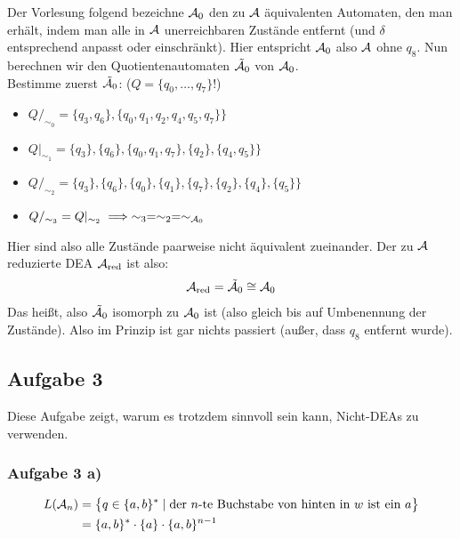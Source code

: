 Der Vorlesung folgend bezeichne $\mathcal{A}_0$ den zu $\mathcal{A}$ äquivalenten Automaten, den man erhält, indem man alle in $\mathcal{A}$ unerreichbaren Zustände entfernt (und $\delta$ entsprechend anpasst oder einschränkt). 
Hier entspricht $\mathcal{A}_0$ also $\mathcal{A}$ ohne $q_8$.\nl
Nun berechnen wir den Quotientenautomaten $\tilde{\mathcal{A}}_0$ von $\mathcal{A}_0$.\\
Bestimme zuerst $\tilde{\mathcal{A}}_0$: ($Q=\lbrace q_0,\ldots,q_7\rbrace$!)
\begin{itemize}
	\item $Q/_{\sim_0}=\big\lbrace q_3,q_6\rbrace,\lbrace q_0,q_1,q_2,q_4,q_5,q_7\rbrace\big\rbrace$
	\item $Q|_{\sim_1}=\big\lbrace q_3\rbrace,\lbrace q_6\rbrace,\lbrace q_0,q_1,q_7\rbrace,\lbrace q_2\rbrace,\lbrace q_4,q_5\rbrace\big\rbrace$
	\item $Q/_{\sim_2}=\big\lbrace q_3\rbrace,\lbrace q_6\rbrace,\lbrace q_0\rbrace,\lbrace q_1\rbrace,\lbrace q_7\rbrace,\lbrace q_2\rbrace,\lbrace q_4\rbrace,\lbrace q_5\rbrace\big\rbrace$
	\item $Q/_{\sim_3}=Q|_{\sim_2}\implies\sim_3=\sim_2=\sim_{\mathcal{A}_0}$
\end{itemize}
Hier sind also alle Zustände paarweise nicht äquivalent zueinander. 
Der zu $\mathcal{A}$ reduzierte DEA $\mathcal{A}_{\text{red}}$ ist also:
\begin{align*}
	\mathcal{A}_{\text{red}}=\tilde{\mathcal{A}}_0\cong\mathcal{A}_0
\end{align*}
Das heißt, also $\tilde{\mathcal{A}}_0$ isomorph zu $\mathcal{A}_0$ ist (also gleich bis auf Umbenennung der Zustände). Also im Prinzip ist gar nichts passiert (außer, dass $q_8$ entfernt wurde).

\subsection{Aufgabe 3}
Diese Aufgabe zeigt, warum es trotzdem sinnvoll sein kann, Nicht-DEAs zu verwenden.

\subsubsection{Aufgabe 3 a)}
\begin{align*}
	L(\mathcal{A}_n)
	&=\big\lbrace q\in\lbrace a,b\rbrace^\ast\mid\text{der $n$-te Buchstabe von hinten in $w$ ist ein }a\big\rbrace\\
	&=\lbrace a,b\rbrace^\ast\cdot\lbrace a\rbrace\cdot\lbrace a,b\rbrace^{n-1}
\end{align*}

